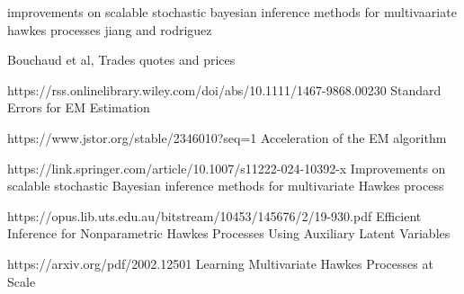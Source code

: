 \documentclass[honours,12pt]{unswthesis}
\numberwithin{equation}{section}
\begin{document}
\begin{thebibliography}{999}
improvements on scalable stochastic bayesian inference methods for multivaariate hawkes processes
jiang and rodriguez

Bouchaud et al, Trades quotes and prices


https://rss.onlinelibrary.wiley.com/doi/abs/10.1111/1467-9868.00230
Standard Errors for EM Estimation

https://www.jstor.org/stable/2346010?seq=1
Acceleration of the EM algorithm

https://link.springer.com/article/10.1007/s11222-024-10392-x
Improvements on scalable stochastic Bayesian inference methods for multivariate Hawkes process


https://opus.lib.uts.edu.au/bitstream/10453/145676/2/19-930.pdf
Efficient Inference for Nonparametric Hawkes Processes Using Auxiliary Latent Variables

https://arxiv.org/pdf/2002.12501
Learning Multivariate Hawkes Processes at Scale


\end{thebibliography}
\end{document}
